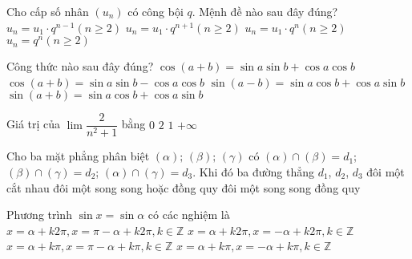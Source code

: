 \begin{ex}%
Cho cấp số nhân $\left(u_n\right)$ có công bội $q$. Mệnh đề nào sau đây đúng?
\choice
{\True $u_n=u_1 \cdot q^{n-1}(n \geq 2)$}
{ $u_n=u_1 \cdot q^{n+1}(n \geq 2)$}
{ $u_n=u_1 \cdot q^{n}(n \geq 2)$}
{ $u_n=q^{n}(n \geq 2)$}
\end{ex}

\begin{ex}%
Công thức nào sau đây đúng?
\choice
{$\cos\left(a+b\right)=\sin a\sin b+\cos a\cos b$}
{$\cos\left(a+b\right)=\sin a\sin b-\cos a\cos b$}
{$\sin\left(a-b\right)=\sin a\cos b+\cos a\sin b$}
{\True $\sin\left(a+b\right)=\sin a\cos b+\cos a\sin b$}

\end{ex}

\begin{ex}%
Giá trị của $\lim \dfrac{2}{n^2+1}$ bằng
\choice
{\True $0$}
{$2$}
{$1$}
{$+\infty$}
\end{ex}

\begin{ex}%
Cho ba mặt phẳng phân biệt $(\alpha);\,(\beta);\,(\gamma)$ có $(\alpha)\cap(\beta)=d_1$; $(\beta)\cap(\gamma)=d_2$; $(\alpha)\cap(\gamma)=d_3$. Khi đó ba đường thẳng $d_1$, ${d_2}$, ${d_3}$
\choice
{đôi một cắt nhau}
{\True đôi một song song hoặc đồng quy}
{đôi một song song}
{đồng quy}
\end{ex}

\begin{ex}%
Phương trình $\sin x=\sin\alpha $ có các nghiệm là
\choice
{\True $x=\alpha+k 2 \pi, x=\pi-\alpha+k 2 \pi, k \in \mathbb{Z}$}
{$x=\alpha+k 2 \pi, x=-\alpha+k 2 \pi, k \in \mathbb{Z}$}
{$x=\alpha+k \pi, x=\pi-\alpha+k \pi, k \in \mathbb{Z}$}
{$x=\alpha+k \pi, x=-\alpha+k \pi, k \in \mathbb{Z}$}
\end{ex}


